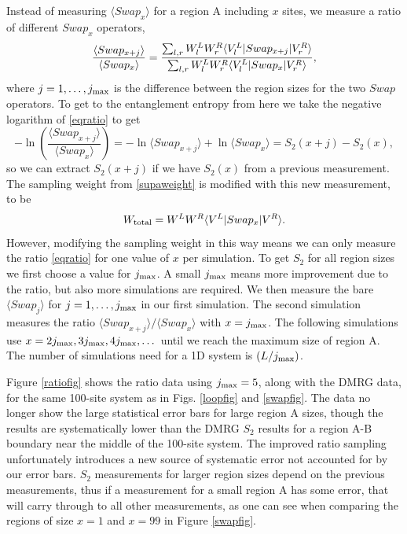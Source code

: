 Instead of measuring  $\langle Swap_x \rangle$ for a region A including $x$ sites, we measure a ratio of different $Swap_x$ operators,
\begin{equation}
\label{eqratio}
\frac{\langle Swap_{x+j}\rangle}{\langle Swap_{x}\rangle} = 
\frac{ \sum_{l,r} W^L_l W^R_r \langle {V^L_l} \rvert Swap_{x+j} \lvert {V^R_r} \rangle}
							{\sum_{l,r} W^L_l W_r^R \langle {V^L_l} \rvert Swap_x \lvert { V^R_r} \rangle},
\end{equation}
where $j=1,\dots,j_{\rm max}$ is the difference between the region sizes for the two $Swap$ operators.
To get to the entanglement entropy from here we take the negative logarithm of \eqref{eqratio} to get
\begin{equation}
\label{eqratio2}
-\ln\left( \frac{\langle Swap_{x+j}\rangle}{\langle Swap_{x}\rangle} \right) = 
-\ln \langle Swap_{x+j}\rangle + \ln\langle Swap_{x}\rangle   =   S_2(x+j) - S_2(x),
\end{equation}
so we can extract $S_2(x+j)$ if we have $S_2(x)$ from a previous measurement.
The sampling weight from \eqref{supaweight} is modified with this new measurement, to be
\begin{equation}
W_{\rm total} = W^LW^R\langle {V^L} \rvert Swap_x \lvert {V^R} \rangle.
\end{equation}
However, modifying the sampling weight in this way means we can only measure the ratio \eqref{eqratio} for one value of $x$ per simulation.
To get $S_2$ for all region sizes we first choose a value for $j_{\rm max}$.
A small $j_{\rm max}$ means more improvement due to the ratio, but also more simulations are required.
We then measure the bare $\langle Swap_{j}\rangle$ for $j=1,\dots,j_{\rm max}$ in our first simulation.
The second simulation measures the ratio $\langle Swap_{x+j}\rangle / \langle Swap_{x}\rangle$ with $x=j_{\rm max}$.  The following simulations use $x=2j_{\rm max}, 3j_{\rm max}, 4j_{\rm max}, \dots$ until we reach the maximum size of region A.
The number of simulations need for a 1D system is $(L/j_{\rm max})$.

Figure \ref{ratiofig} shows the ratio data using $j_{\rm max} = 5$, along with the DMRG data, for the same 100-site system as in Figs. \ref{loopfig} and \ref{swapfig}. 
The data no longer show the large statistical error bars for large region A sizes, though the results are systematically lower than the DMRG $S_2$ results for a region A-B boundary near the middle of the 100-site system.  
The improved ratio sampling unfortunately introduces a new source of systematic error not accounted for by our error bars.  
$S_2$ measurements for larger region sizes depend on the previous measurements, thus if a measurement for a small region A has some error, that will carry through to all other measurements, as one can see when comparing the regions of size $x=1$ and $x=99$ in Figure \ref{swapfig}.

